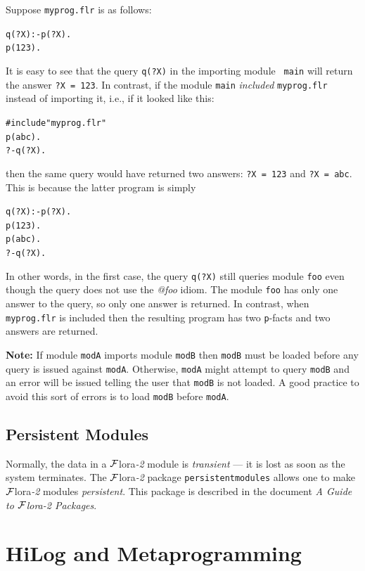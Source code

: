 \documentclass[11pt]{article}
\newcommand{\FLSYSTEM}{{\mbox{\sc ${\cal F}${lora}\rm\emph{-2}}}\xspace}
\newcommand{\flrext}{flr}
\begin{document}
Suppose {\tt myprog.\flrext} is as follows:
\begin{alltt}
  q(?X) :- p(?X).
  p(123).
\end{alltt}
It is easy to see that the query {\tt q(?X)} in the importing module {\tt
  main} will return the answer {\tt ?X = 123}. In contrast, if the module
{\tt main} \emph{included} {\tt myprog.\flrext} instead of importing it, i.e.,
if it looked like this:
\begin{alltt}
  #include "myprog.\flrext"
  p(abc).
  ?- q(?X).
\end{alltt}
then the same query would have returned two answers: {\tt ?X = 123} and 
{\tt ?X = abc}. This is because the latter program is simply
\begin{alltt}
  q(?X) :- p(?X).
  p(123).
  p(abc).
  ?- q(?X).
\end{alltt}
In other words, in the first case, the query {\tt q(?X)} still queries
module {\tt foo} even though the query does not use the \emph{@foo}    
idiom. The module {\tt foo} has only one answer to the query, so only one
answer is returned. In contrast, when {\tt myprog.\flrext} is included then
the resulting program has two {\tt p}-facts and two answers are returned. 

\textbf{Note:} If module \texttt{modA} imports module \texttt{modB}
then \texttt{modB} must be loaded before
any query is issued against \texttt{modA}. Otherwise, \texttt{modA} might
attempt to query \texttt{modB} and an error will be issued telling the user
that \texttt{modB} is not loaded. A good practice to avoid this sort of
errors is to load \texttt{modB} before \texttt{modA}.

\subsection{Persistent Modules}\label{sec-persist-storage}

Normally, the data
in a \FLSYSTEM module is
{\em transient} --- it is lost as soon as the system terminates.
The \FLSYSTEM package {\tt persistentmodules}  allows one to make
\FLSYSTEM modules \emph{persistent}. This package is described in
the document \emph{A Guide to \FLSYSTEM Packages}.


\section{HiLog and Metaprogramming} \label{sec:hilog}
\end{document}
